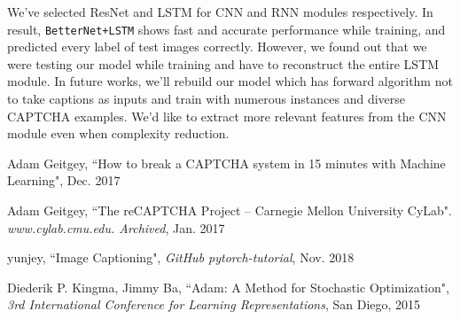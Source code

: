 \documentclass[10pt,twocolumn, letterpaper]{article}
\begin{document}
We've selected ResNet and LSTM for CNN and RNN modules respectively. In result, \texttt{BetterNet+LSTM} shows fast and accurate performance while training, and predicted every label of test images correctly. However, we found out that we were testing our model while training and have to reconstruct the entire LSTM module. In future works, we'll rebuild our model which has forward algorithm not to take captions as inputs and train with numerous instances and diverse CAPTCHA examples. We'd like to extract more relevant features from the CNN module even when complexity reduction.

\begin{thebibliography}{9}

Adam Geitgey, ``How to break a CAPTCHA system in 15 minutes with Machine Learning", Dec. 2017

Adam Geitgey, ``The reCAPTCHA Project – Carnegie Mellon University CyLab". {\textit{www.cylab.cmu.edu. Archived}}, Jan. 2017

yunjey, ``Image Captioning", {\textit{GitHub pytorch-tutorial}}, Nov. 2018

Diederik P. Kingma, Jimmy Ba, 
``Adam: A Method for Stochastic Optimization", {\textit{3rd International Conference for Learning Representations}}, San Diego, 2015



\end{thebibliography}
\end{document}
